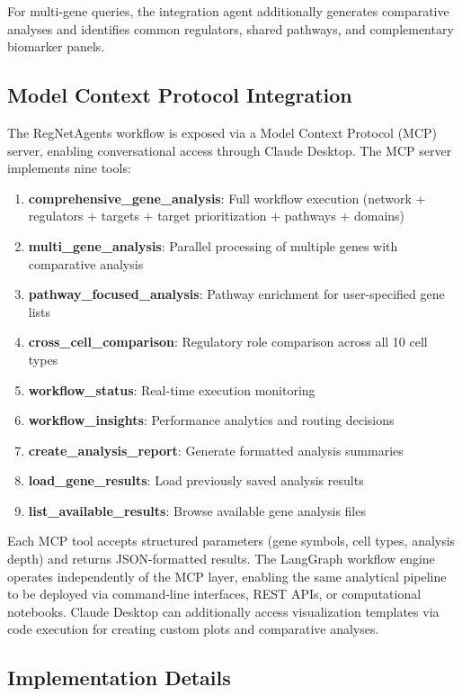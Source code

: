 \documentclass[11pt]{article}
\begin{document}
For multi-gene queries, the integration agent additionally generates comparative analyses and identifies common regulators, shared pathways, and complementary biomarker panels.

\subsection{Model Context Protocol Integration}

The RegNetAgents workflow is exposed via a Model Context Protocol (MCP) server, enabling conversational access through Claude Desktop. The MCP server implements nine tools:

\begin{enumerate}
\item \textbf{comprehensive\_gene\_analysis}: Full workflow execution (network + regulators + targets + target prioritization + pathways + domains)
\item \textbf{multi\_gene\_analysis}: Parallel processing of multiple genes with comparative analysis
\item \textbf{pathway\_focused\_analysis}: Pathway enrichment for user-specified gene lists
\item \textbf{cross\_cell\_comparison}: Regulatory role comparison across all 10 cell types
\item \textbf{workflow\_status}: Real-time execution monitoring
\item \textbf{workflow\_insights}: Performance analytics and routing decisions
\item \textbf{create\_analysis\_report}: Generate formatted analysis summaries
\item \textbf{load\_gene\_results}: Load previously saved analysis results
\item \textbf{list\_available\_results}: Browse available gene analysis files
\end{enumerate}

Each MCP tool accepts structured parameters (gene symbols, cell types, analysis depth) and returns JSON-formatted results. The LangGraph workflow engine operates independently of the MCP layer, enabling the same analytical pipeline to be deployed via command-line interfaces, REST APIs, or computational notebooks. Claude Desktop can additionally access visualization templates via code execution for creating custom plots and comparative analyses.

\subsection{Implementation Details}
\end{document}

